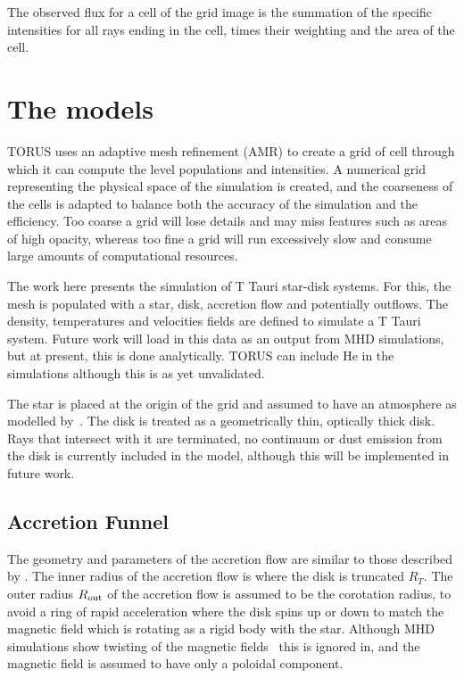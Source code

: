 \documentclass[fleqn,usenatbib]{mnras}
\begin{document}
The observed flux for a cell of the grid image is the summation of the specific intensities for all rays ending in the cell, times their weighting and the area of the cell.

\section{The models}
\label{sec:model}

TORUS uses an adaptive mesh refinement (AMR) to create a grid of cell through which it can compute the level populations and intensities.  A numerical grid representing the physical space of the simulation is created, and the coarseness of the cells is adapted to balance both the accuracy of the simulation and the efficiency. Too coarse a grid will lose details and may miss features such as areas of high opacity, whereas too fine a grid will run excessively slow and consume large amounts of computational resources.

The work here presents the simulation of T Tauri star-disk systems. For this, the mesh is populated with a star, disk, accretion flow and potentially outflows. The density, temperatures and velocities fields are defined to simulate a T Tauri system. Future work will load in this data as an output from MHD simulations, but at present, this is done analytically. TORUS can include He in the simulations although this is as yet unvalidated. 

The star is placed at the origin of the grid and assumed to have an atmosphere as modelled by~\citet{1979ApJS...40....1K}. The disk is treated as a geometrically thin, optically thick disk. Rays that intersect with it are terminated, no continuum or dust emission from the disk is currently included in the model, although this will be implemented in future work.

\subsection{Accretion Funnel}
\label{sec:accretion}
The geometry and parameters of the accretion flow are similar to those described by \citet{1998ApJ...495..385H}. The inner radius of the accretion flow is where the disk is truncated $R_{T}$. The outer radius $R_{\rm out}$ of the accretion flow is assumed to be the corotation radius, to avoid a ring of rapid acceleration where the disk spins up or down to match the magnetic field which is rotating as a rigid body with the star. Although MHD simulations show twisting of the magnetic fields~\citep[e.g.][]{Uzdensky:2002dg} this is ignored in, and the magnetic field is assumed to have only a poloidal component.
\end{document}
